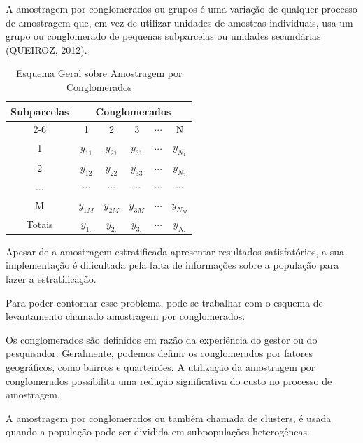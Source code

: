 A amostragem por conglomerados ou grupos é uma variação de qualquer processo de amostragem que, em vez de utilizar unidades de amostras individuais, usa um grupo ou conglomerado de pequenas subparcelas ou unidades secundárias (QUEIROZ, 2012).\vskip0.3cm


\begin{table}[!htb]
\centering
    {
    \caption{Esquema Geral sobre Amostragem por Conglomerados}
    \label{amostras estratificada}
    \vspace{0.1cm}
\begin{tabular}{c|c|c|c|c|c}
\hline\hline
\multirow{2}{*}{Subparcelas} & \multicolumn{5}{c}{Conglomerados}              \\
\cline{2-6}
                             & 1         & 2        &   3       & $\cdots$ & N            \\
\hline\hline
1                            & $y_{11}$  & $y_{21}$ &  $y_{31}$ & $\cdots$ & $y_{N_{1}}$  \\
2                            & $y_{12}$  & $y_{22}$ &  $y_{33}$ & $\cdots$ & $y_{N_{2}}$  \\
...                          & $\cdots$  & $\cdots$ &  $\cdots$ & $\cdots$ & $\cdots$     \\
M                            & $y_{1M}$  & $y_{2M}$ &  $y_{3M}$ & $\cdots$ & $y_{N_{M}}$   \\
\hline\hline
Totais                       &  $y_{1.}$ & $y_{2.}$ &  $y_{3.}$ &   $\cdots$       & $y_{N.}$   \\
\hline\hline
\end{tabular}}
\end{table}

Apesar de a amostragem estratificada apresentar resultados
satisfatórios, a sua implementação é dificultada pela falta
de informações sobre a população para fazer a estratificação.\vskip0.3cm

Para poder contornar esse problema, pode-se trabalhar com o
esquema de levantamento chamado amostragem por conglomerados.\vskip0.3cm

Os conglomerados são definidos em razão da experiência
do gestor ou do pesquisador. Geralmente, podemos definir os
conglomerados por fatores geográficos, como bairros e quarteirões.
A utilização da amostragem por conglomerados possibilita uma
redução significativa do custo no processo de amostragem.\vskip0.3cm

A amostragem por conglomerados ou também chamada de clusters, é usada quando a população
pode ser dividida em subpopulações heterogêneas.\vskip0.3cm

